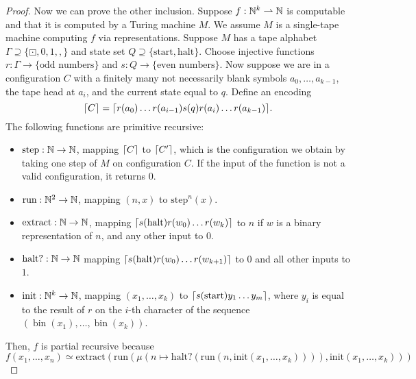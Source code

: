 \begin{proof}
  Now we can prove the other inclusion.
  Suppose $f: \mathbb{N}^k \rightharpoonup \mathbb{N}$ is computable and that it is computed by
  a Turing machine $M$.
  We assume $M$ is a single-tape machine computing $f$ via representations.
  Suppose $M$ has a tape alphabet $\Gamma \supseteq \{\boxdot, 0, 1,
  \mathtt{,}\}$ and state set $Q \supseteq \{\text{start}, \text{halt}\}$.
  Choose injective functions $r: \Gamma \to \{\text{odd numbers}\}$ and $s: Q
  \to \{\text{even numbers}\}$.
  Now suppose we are in a configuration $C$ with a finitely many not necessarily
  blank symbols $a_0, \ldots, a_{k-1}$, the tape head at $a_i$, and the current
  state equal to $q$.
  Define an encoding
  \[
	\lceil C \rceil = \lceil r(a_0) \ldots r(a_{i-1}) s(q) r(a_i) \ldots r(a_{k-1}) \rceil.
  \]
  The following functions are primitive recursive:
  \begin{itemize}
  \item $\text{step}: \mathbb{N} \to \mathbb{N}$, mapping $\lceil C \rceil$ to $\lceil C' \rceil$, which is
	the configuration we obtain by taking one step of $M$ on configuration $C$.
	If the input of the function is not a valid configuration, it returns $0$.
  \item $\text{run}: \mathbb{N}^2 \to \mathbb{N}$, mapping $(n,x)$ to $\text{step}^n(x)$.
  \item $\text{extract}: \mathbb{N} \to \mathbb{N}$, mapping $\lceil s(\text{halt}) r(w_0) \ldots
	  r(w_k) \rceil$ to $n$ if $w$ is a binary representation of $n$, and any other
	input to $0$.
  \item $\text{halt?}: \mathbb{N} \to \mathbb{N}$ mapping $\lceil s(\text{halt}) r(w_0) \ldots
	  r(w_{k+1}) \rceil$ to $0$ and all other inputs to $1$.
  \item $\text{init}: \mathbb{N}^k \to \mathbb{N}$, mapping $(x_1, \ldots, x_k)$ to
	$\lceil s(\text{start}) y_1 \ldots y_m \rceil$, where $y_i$ is equal to the result
	of $r$ on the $i$-th character of the sequence $(\operatorname{bin}(x_1),
	\ldots, \operatorname{bin}(x_k))$.
  \end{itemize}
  Then, $f$ is partial recursive because
  \[
	f(x_1, \ldots, x_n) \simeq \text{extract}(\text{run}(
	\mu(n \mapsto \text{halt?}(\text{run}(n, \text{init}(x_1, \ldots, x_k)))),
	\text{init}(x_1, \ldots, x_k)
	))
  \]
\end{proof}